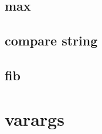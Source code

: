 

\subsection{max}







\subsection{compare string}





\subsection{fib}





\section{varargs}



